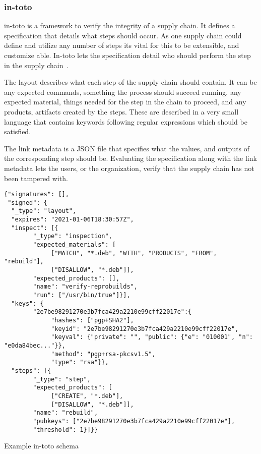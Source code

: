 \documentclass[../Main/thesis.tex]{subfiles}
\begin{document}
\subsubsection*{in-toto}%
\label{sub:in-toto}
in-toto is a framework to verify the integrity of a supply chain. It defines a
specification that details what steps should occur. As one supply chain could
define and utilize any number of steps its vital for this to be extensible, and
customize able. In-toto lets the specification detail who should perform the
step in the supply chain~\cite{in-toto}.

The layout describes what each step of the supply chain should contain. It can
be any expected commands, something the process should succeed running, any
expected material, things needed for the step in the chain to proceed, and any
products, artifacts created by the steps. These are described in a very small
language that contains keywords following regular expressions which should be
satisfied.

The link metadata is a JSON file that specifies what the values, and outputs of
the corresponding step should be. Evaluating the specification along with the
link metadata lets the users, or the organization, verify that the supply chain
has not been tampered with. 

\begin{listing}[H]
\begin{verbatim}
{"signatures": [],
 "signed": {
  "_type": "layout",
  "expires": "2021-01-06T18:30:57Z",
  "inspect": [{
        "_type": "inspection",
        "expected_materials": [
             ["MATCH", "*.deb", "WITH", "PRODUCTS", "FROM", "rebuild"],
             ["DISALLOW", "*.deb"]],
        "expected_products": [],
        "name": "verify-reprobuilds",
        "run": ["/usr/bin/true"]}],
  "keys": {
        "2e7be98291270e3b7fca429a2210e99cff22017e":{
             "hashes": ["pgp+SHA2"],
             "keyid": "2e7be98291270e3b7fca429a2210e99cff22017e",
             "keyval": {"private": "", "public": {"e": "010001", "n": "e0da84bec..."}},
             "method": "pgp+rsa-pkcsv1.5",
             "type": "rsa"}},
  "steps": [{
        "_type": "step",
        "expected_products": [
             ["CREATE", "*.deb"],
             ["DISALLOW", "*.deb"]],
        "name": "rebuild",
        "pubkeys": ["2e7be98291270e3b7fca429a2210e99cff22017e"],
        "threshold": 1}]}}
\end{verbatim}
\caption{Example in-toto schema}
\label{lst:in-toto-schema}
\end{listing}
\end{document}
